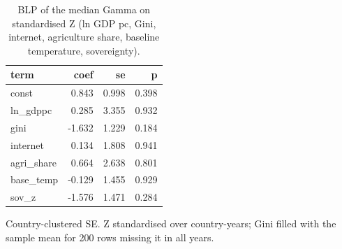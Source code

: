 \begin{table}[htbp]
\centering
\caption{BLP of the median Gamma on standardised Z (ln GDP pc, Gini, internet, agriculture share, baseline temperature, sovereignty).}
\label{tab:agri_blp}
\begin{tabular}{lrrr}
\toprule
term & coef & se & p \\
\midrule
const & 0.843 & 0.998 & 0.398 \\
ln\_gdppc & 0.285 & 3.355 & 0.932 \\
gini & -1.632 & 1.229 & 0.184 \\
internet & 0.134 & 1.808 & 0.941 \\
agri\_share & 0.664 & 2.638 & 0.801 \\
base\_temp & -0.129 & 1.455 & 0.929 \\
sov\_z & -1.576 & 1.471 & 0.284 \\
\bottomrule
\end{tabular}
\par\smallskip\footnotesize Country-clustered SE. Z standardised over country-years; Gini filled with the sample mean for 200 rows missing it in all years.
\end{table}
